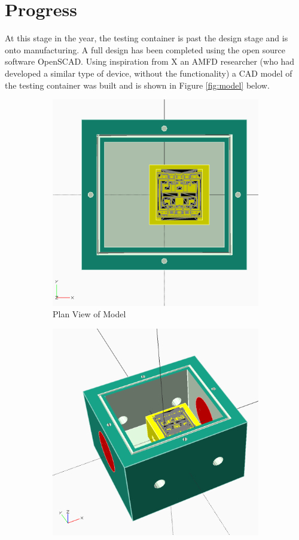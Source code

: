 \documentclass[a4paper,11pt]{article}
\begin{document}
\section{Progress}
At this stage in the year, the testing container is past the design stage and is onto manufacturing. A full design has been completed using the open source software OpenSCAD. Using inspiration from X an AMFD researcher (who had developed a similar type of device, without the functionality) a CAD model of the testing container was built and is shown in Figure \ref{fig:model} below. \\
\begin{figure}[h]
\begin{subfigure}{0.5\textwidth}
\includegraphics[width=0.9\linewidth]{fig1a}
\caption{Plan View of Model}
\label{fig:subim1}
\end{subfigure} \begin{subfigure}{0.5\textwidth}
\includegraphics[width=0.9\linewidth]{fig1b}

\end{subfigure}
\end{figure}
\end{document}

